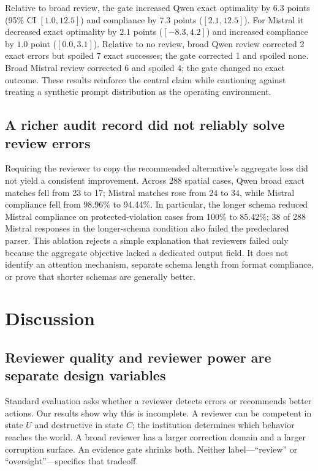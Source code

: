 \documentclass[10pt]{article}
\begin{document}
Relative to broad review, the gate increased Qwen exact optimality by $6.3$
points (95\% CI $[1.0,12.5]$) and compliance by $7.3$ points
($[2.1,12.5]$). For Mistral it decreased exact optimality by $2.1$ points
($[-8.3,4.2]$) and increased compliance by $1.0$ point ($[0.0,3.1]$).
Relative to no review, broad Qwen review corrected 2 exact errors but spoiled 7
exact successes; the gate corrected 1 and spoiled none. Broad Mistral review
corrected 6 and spoiled 4; the gate changed no exact outcome. These results
reinforce the central claim while cautioning against treating a synthetic prompt
distribution as the operating environment.

\subsection{A richer audit record did not reliably solve review errors}

Requiring the reviewer to copy the recommended alternative's aggregate loss did
not yield a consistent improvement. Across 288 spatial cases, Qwen broad exact
matches fell from 23 to 17; Mistral matches rose from 24 to 34, while Mistral
compliance fell from 98.96\% to 94.44\%. In particular, the longer schema reduced
Mistral compliance on protected-violation cases from 100\% to 85.42\%; 38 of
288 Mistral responses in the longer-schema condition also failed the predeclared
parser. This ablation rejects a simple explanation that reviewers failed only
because the aggregate objective lacked a dedicated output field. It does not
identify an attention mechanism, separate schema length from format compliance,
or prove that shorter schemas are generally better.

\section{Discussion}

\subsection{Reviewer quality and reviewer power are separate design variables}

Standard evaluation asks whether a reviewer detects errors or recommends better
actions. Our results show why this is incomplete. A reviewer can be competent in
state $U$ and destructive in state $C$; the institution determines which behavior
reaches the world. A broad reviewer has a larger correction domain and a larger
corruption surface. An evidence gate shrinks both. Neither label---``review'' or
``oversight''---specifies that tradeoff.
\end{document}
